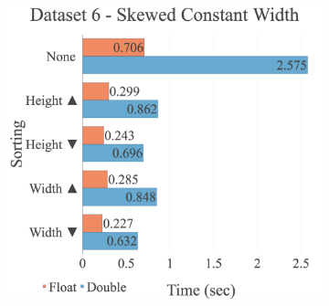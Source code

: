 \begin{figure}[H]
\begin{adjustwidth}{-2cm}{-2cm}
\begin{subfigure}{.62\textwidth}
\end{subfigure}
\par\bigskip
\par\bigskip
\centering
\begin{subfigure}{.62\textwidth}
  \includegraphics[width=1\textwidth]{img/experiments/option-sorts-6_SKEWEDCONSTWIDTH.png}
\end{subfigure}
\end{adjustwidth}
\end{figure}


